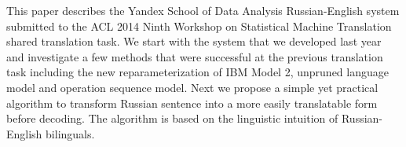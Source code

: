 This paper describes the Yandex School of Data Analysis Russian-English system submitted to the ACL 2014 Ninth Workshop on Statistical Machine Translation shared translation task. We start with the system that we developed last year and investigate a few methods that were successful at the previous translation task including the new reparameterization of IBM Model 2, unpruned language model and operation sequence model. Next we propose a {simple yet practical} algorithm to transform Russian sentence into a more easily translatable form before decoding. The algorithm is based on the linguistic intuition of Russian-English bilinguals.
